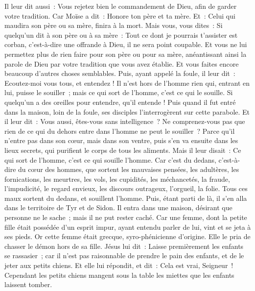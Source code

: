 \begin{multicols}{2}
Il leur dit aussi~: Vous rejetez bien le commandement de Dieu, afin de garder votre tradition.
Car Moïse a dit~: Honore ton père et ta mère. Et~: Celui qui maudira son père ou sa mère, finira à la mort.
Mais vous, vous dites~: Si quelqu'un dit à son père ou à sa mère~: Tout ce dont je pourrais t'assister est corban, c'est-à-dire une offrande à Dieu, il ne sera point coupable.
Et vous ne lui permettez plus de rien faire pour son père ou pour sa mère,
anéantissant ainsi la parole de Dieu par votre tradition que vous avez établie. Et vous faites encore beaucoup d'autres choses semblables.
Puis, ayant appelé la foule, il leur dit~: Ecoutez-moi vous tous, et entendez !
Il n'est hors de l'homme rien qui, entrant en lui, puisse le souiller~; mais ce qui sort de l'homme, c'est ce qui le souille.
Si quelqu'un a des oreilles pour entendre, qu'il entende !
Puis quand il fut entré dans la maison, loin de la foule, ses disciples l'interrogèrent sur cette parabole.
Et il leur dit~: Vous aussi, êtes-vous sans intelligence~? Ne comprenez-vous pas que rien de ce qui du dehors entre dans l'homme ne peut le souiller~?
Parce qu'il n'entre pas dans son cœur, mais dans son ventre, puis s'en va ensuite dans les lieux secrets, qui purifient le corps de tous les aliments.
Mais il leur disait~: Ce qui sort de l'homme, c'est ce qui souille l'homme.
Car c'est du dedans, c'est-à-dire du cœur des hommes, que sortent les mauvaises pensées, les adultères, les fornications, les meurtres,
les vols, les cupidités, les méchancetés, la fraude, l'impudicité, le regard envieux, les discours outrageux, l'orgueil, la folie.
Tous ces maux sortent du dedans, et souillent l'homme.
Puis, étant parti de là, il s'en alla dans le territoire de Tyr et de Sidon. Il entra dans une maison, désirant que personne ne le sache~; mais il ne put rester caché.
Car une femme, dont la petite fille était possédée d'un esprit impur, ayant entendu parler de lui, vint et se jeta à ses pieds.
Or cette femme était grecque, syro-phénicienne d'origine. Elle le pria de chasser le démon hors de sa fille. Jésus lui dit~:
Laisse premièrement les enfants se rassasier~; car il n'est pas raisonnable de prendre le pain des enfants, et de le jeter aux petits chiens.
Et elle lui répondit, et dit~: Cela est vrai, Seigneur~! Cependant les petits chiens mangent sous la table les miettes que les enfants laissent tomber.

\end{multicols}
